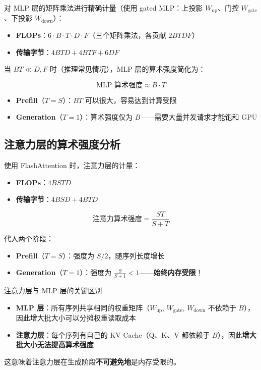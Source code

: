 \documentclass[a4paper]{article}
\begin{document}
对 MLP 层的矩阵乘法进行精确计量（使用 gated MLP：上投影 $W_\text{up}$、门控 $W_\text{gate}$、下投影 $W_\text{down}$）：

\begin{itemize}
    \item \textbf{FLOPs}：$6 \cdot B \cdot T \cdot D \cdot F$（三个矩阵乘法，各贡献 $2BTDF$）
    \item \textbf{传输字节}：$4BTD + 4BTF + 6DF$
\end{itemize}

当 $BT \ll D, F$ 时（推理常见情况），MLP 层的算术强度简化为：

$$\text{MLP 算术强度} \approx B \cdot T$$

\begin{itemize}
    \item \textbf{Prefill}（$T = S$）：$BT$ 可以很大，容易达到计算受限
    \item \textbf{Generation}（$T = 1$）：算术强度仅为 $B$——需要大量并发请求才能饱和 GPU
\end{itemize}

\subsection{注意力层的算术强度分析}

使用 FlashAttention 时，注意力层的计量：

\begin{itemize}
    \item \textbf{FLOPs}：$4BSTD$
    \item \textbf{传输字节}：$4BSD + 4BTD$
\end{itemize}

$$\text{注意力算术强度} = \frac{ST}{S + T}$$

代入两个阶段：

\begin{itemize}
    \item \textbf{Prefill}（$T = S$）：强度为 $S/2$，随序列长度增长
    \item \textbf{Generation}（$T = 1$）：强度为 $\frac{S}{S+1} < 1$——\textbf{始终内存受限}！
\end{itemize}

\begin{warningbox}{注意力层与 MLP 层的关键区别}
\begin{itemize}
    \item \textbf{MLP 层}：所有序列共享相同的权重矩阵（$W_\text{up}$, $W_\text{gate}$, $W_\text{down}$ 不依赖于 $B$），因此增大批大小可以分摊权重读取成本
    \item \textbf{注意力层}：每个序列有自己的 KV Cache（Q、K、V 都依赖于 $B$），因此\textbf{增大批大小无法提高算术强度}
\end{itemize}
这意味着注意力层在生成阶段\textbf{不可避免地}是内存受限的。
\end{warningbox}
\end{document}
